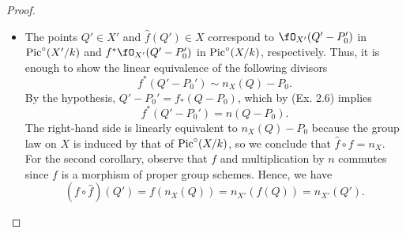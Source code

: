\documentclass[a4paper]{article}
\begin{document}
\begin{enumerate} [label=\textbf{\arabic*.}, leftmargin=0em]
\begin{proof}
\begin{itemize} [leftmargin=0cm]
                  \item[(c)] The points $Q' \in X'$ and $\hat{f}(Q') \in X$ correspond to $\fO_{X'}(Q' - P_0')$ in $\operatorname{Pic}^\circ(X'/k)$ and $f^*\fO_{X'}(Q' - P_0')$ in $\operatorname{Pic}^\circ(X/k)$, respectively.
                        Thus, it is enough to show the linear equivalence of the following divisors
                        \begin{equation*}
                            f^*(Q' - P_0') \sim n_X(Q) - P_0.
                        \end{equation*}
                        By the hypothesis, $Q' - P_0' = f_*(Q - P_0)$, which by (Ex. 2.6) implies
                        \begin{equation*}
                            f^*(Q' - P_0') = n(Q - P_0).
                        \end{equation*}
                        The right-hand side is linearly equivalent to $n_X(Q) - P_0$ because the group law on $X$ is induced by that of $\operatorname{Pic}^\circ(X/k)$, so we conclude that $\hat{f} \circ f = n_X$.
                        For the second corollary, observe that $f$ and multiplication by $n$ commutes since $f$ is a morphism of proper group schemes.
                        Hence, we have
                        \begin{equation*}
                            (f \circ \hat{f})(Q') = f(n_X(Q)) = n_{X'}(f(Q)) = n_{X'}(Q').
                        \end{equation*}


\end{itemize}
\end{proof}
\end{enumerate}
\end{document}
